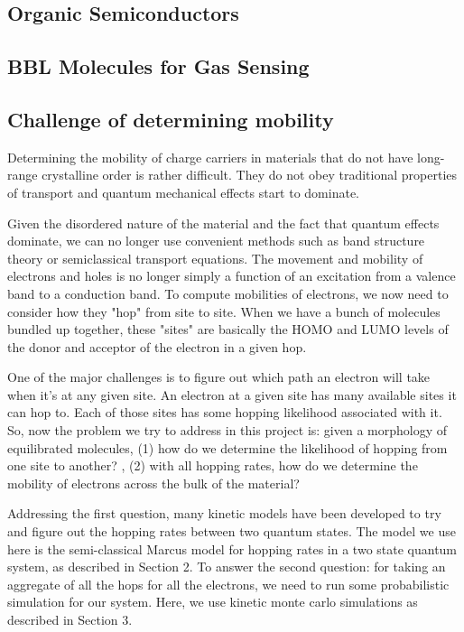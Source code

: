 \documentclass{article}
\begin{document}
\subsection{Organic Semiconductors}

\subsection{BBL Molecules for Gas Sensing}

\subsection{Challenge of determining mobility}

Determining the mobility of charge carriers in materials that do not have long-range crystalline order is rather difficult. They do not obey traditional properties of transport and quantum mechanical effects start to dominate.

Given the disordered nature of the material and the fact that quantum effects dominate, we can no longer use convenient methods such as band structure theory or semiclassical transport equations. The movement and mobility of electrons and holes is no longer simply a function of an excitation from a valence band to a conduction band. To compute mobilities of electrons, we now need to consider how they "hop" from site to site. When we have a bunch of molecules bundled up together, these "sites" are basically the HOMO and LUMO levels of the donor and acceptor of the electron in a given hop.

One of the major challenges is to figure out which path an electron will take when it's at any given site. An electron at a given site has many available sites it can hop to. Each of those sites has some hopping likelihood associated with it. So, now the problem we try to address in this project is: given a morphology of equilibrated molecules, (1) how do we determine the likelihood of hopping from one site to another? , (2) with all hopping rates, how do we determine the mobility of electrons across the bulk of the material?

Addressing the first question, many kinetic models have been developed to try and figure out the hopping rates between two quantum states. The model we use here is the semi-classical Marcus model for hopping rates in a two state quantum system, as described in Section 2. To answer the second question: for taking an aggregate of all the hops for all the electrons, we need to run some probabilistic simulation for our system. Here, we use kinetic monte carlo simulations as described in Section 3. 
\end{document}
